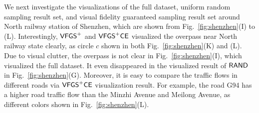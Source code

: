 We next investigate the visualizations of the full dataset, uniform random sampling result set, and visual fidelity guaranteed sampling result set around North railway station of Shenzhen, which are shown from Fig.~\ref{fig:shenzhen}(I) to (L).
Interestingly, $\mathsf{VFGS}^{+}$ and $\mathsf{VFGS}^{+}\mathsf{CE}$ visualized the overpass near North railway state clearly, as circle $c$ shown in both Fig.~\ref{fig:shenzhen}(K) and (L).
Due to visual clutter, the overpass is not clear in Fig.~\ref{fig:shenzhen}(I), which visualized the full dataset.
It even disappeared in the visualized result of $\mathsf{RAND}$ in Fig.~\ref{fig:shenzhen}(G).
Moreover, it is easy to compare the traffic flows in different roads via $\mathsf{VFGS}^{+}\mathsf{CE}$ visualization result.
For example, the road G94 has a higher road traffic flow than the Minzhi Avenue and Meilong Avenue, as different colors shown in Fig.~\ref{fig:shenzhen}(L).









